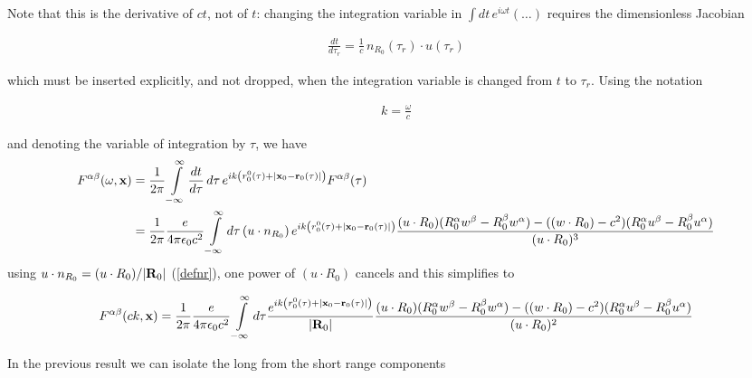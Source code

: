 Note that this is the derivative of $ct$, not of $t$: changing the integration
variable in $\int dt\, e^{i\omega t}(\ldots)$ requires the dimensionless
Jacobian
\begin{importantbox}
  \begin{align}
    \frac{dt}{d\tau_r}=\frac1c\, n_{R_0}(\tau_r)\cdot u(\tau_r)\label{dtdtaur}
  \end{align}
\end{importantbox}
which must be inserted explicitly, and not dropped, when the integration
variable is changed from $t$ to $\tau_r$.
Using the notation
\begin{importantbox}
  \begin{align}
    k = \frac{\omega}c\label{defk-primar}
  \end{align}
\end{importantbox}
and denoting the variable of integration by $\tau$, we have
\begin{align}
  F^{\alpha\beta}(\omega,{\bf x}) & =\frac1{2\pi}\int\limits_{-\infty}^{\infty}\frac{dt}{d\tau}\,d\tau\, e^{ik\left(r_0^0(\tau)+|{\bf x}_0-{\bf r}_0(\tau)|\right)}F^{\alpha\beta}(\tau)\nonumber                                                                                                            \\
  & =\frac1{2\pi}\frac{e}{4\pi\epsilon_0c^2}\int\limits_{-\infty}^{\infty}d\tau\,(u\cdot n_{R_0})\, e^{ik\left(r_0^0(\tau)+|{\bf x}_0-{\bf r}_0(\tau)|\right)}\frac{(u\cdot R_0)(R_0^{\alpha}w^{\beta}-R_0^{\beta}w^{\alpha})
  -((w\cdot R_0)-c^2)(R_0^{\alpha}u^{\beta}-R_0^{\beta}u^{\alpha})}
  {(u\cdot R_0)^3}
\end{align}
using $u\cdot n_{R_0}=(u\cdot R_0)/|{\bf R}_0|$ (\ref{defnr}), one power of
$(u\cdot R_0)$ cancels and this simplifies to
\begin{importantbox}
  \begin{align}
    F^{\alpha\beta}(ck,{\bf x})=\frac1{2\pi}\frac{e}{4\pi\epsilon_0c^2}\int\limits_{-\infty}^{\infty}d\tau \frac{e^{ik\left(r_0^0(\tau)+|{\bf x}_0-{\bf r}_0(\tau)|\right)}}{|{\bf R}_0|}\frac{(u\cdot R_0)(R_0^{\alpha}w^{\beta}-R_0^{\beta}w^{\alpha})
    -((w\cdot R_0)-c^2)(R_0^{\alpha}u^{\beta}-R_0^{\beta}u^{\alpha})}
    {(u\cdot R_0)^2}\label{eq:F-direct-corrected}
  \end{align}
\end{importantbox}
In the previous result we can isolate the long from the short range components
